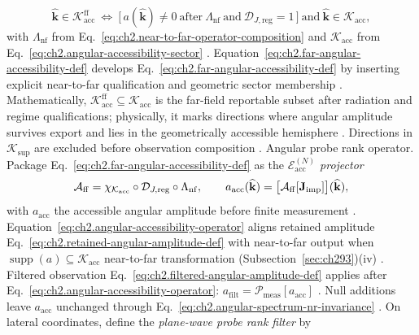 \begin{equation}
\label{eq:ch2.far-angular-accessibility-def}
\widehat{\mathbf{k}}\in\mathcal{K}_{\mathrm{acc}}^{\mathrm{ff}}
\ \Longleftrightarrow\
\Big[\,
a(\widehat{\mathbf{k}})\neq 0
\ \text{after}\ \Lambda_{\mathrm{nf}}
\ \text{and}\ \mathcal{D}_{J,\mathrm{reg}}=1
\,\Big]
\ \text{and}\ 
\widehat{\mathbf{k}}\in\mathcal{K}_{\mathrm{acc}},
\end{equation}
with \(\Lambda_{\mathrm{nf}}\) from Eq.~\eqref{eq:ch2.near-to-far-operator-composition} and
\(\mathcal{K}_{\mathrm{acc}}\) from Eq.~\eqref{eq:ch2.angular-accessibility-sector}
\cite{stratton1941}. Equation~\eqref{eq:ch2.far-angular-accessibility-def}
develops Eq.~\eqref{eq:ch2.far-angular-accessibility-def} by inserting explicit
near-to-far qualification and geometric sector membership \cite{stratton1941}. Mathematically,
\(\mathcal{K}_{\mathrm{acc}}^{\mathrm{ff}}\subseteq\mathcal{K}_{\mathrm{acc}}\) is the
far-field reportable subset after radiation and regime qualifications; physically, it marks directions
where angular amplitude survives export and lies in the geometrically accessible hemisphere
\cite{harrington2001}. Directions in \(\mathcal{K}_{\mathrm{sup}}\) are excluded
before observation composition \cite{stratton1941}.
Angular probe rank operator. Package Eq.~\eqref{eq:ch2.far-angular-accessibility-def} as the \emph{$\mathcal{E}_{\mathrm{acc}}^{(N)}$ projector}
\begin{equation}
\label{eq:ch2.angular-accessibility-operator}
\mathcal{A}_{\mathrm{ff}}
=
\chi_{\mathcal{K}_{\mathrm{acc}}}\circ\mathcal{D}_{J,\mathrm{reg}}\circ\Lambda_{\mathrm{nf}},
\qquad
a_{\mathrm{acc}}(\widehat{\mathbf{k}})
=
\big[\mathcal{A}_{\mathrm{ff}}[\mathbf{J}_{\mathrm{imp}}]\big](\widehat{\mathbf{k}}),
\end{equation}
with \(a_{\mathrm{acc}}\) the accessible angular amplitude before finite measurement
\cite{stratton1941}. Equation~\eqref{eq:ch2.angular-accessibility-operator}
aligns retained amplitude Eq.~\eqref{eq:ch2.retained-angular-amplitude-def} with near-to-far
output when \(\operatorname{supp}(a)\subseteq\mathcal{K}_{\mathrm{acc}}\) near-to-far transformation (Subsection~\ref{sec:ch293})(iv) \cite{stratton1941}. Filtered observation
Eq.~\eqref{eq:ch2.filtered-angular-amplitude-def} applies after
Eq.~\eqref{eq:ch2.angular-accessibility-operator}:
\(a_{\mathrm{filt}}=\mathcal{P}_{\mathrm{meas}}[a_{\mathrm{acc}}]\)
\cite{harrington2001}. Null additions leave \(a_{\mathrm{acc}}\) unchanged through
Eq.~\eqref{eq:ch2.angular-spectrum-nr-invariance} \cite{stratton1941}.
On lateral coordinates, define the \emph{plane-wave probe rank filter} by
